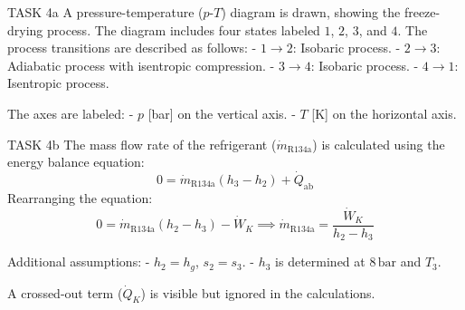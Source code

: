 TASK 4a  
A pressure-temperature (\( p \)-\( T \)) diagram is drawn, showing the freeze-drying process. The diagram includes four states labeled \( 1 \), \( 2 \), \( 3 \), and \( 4 \). The process transitions are described as follows:  
- \( 1 \to 2 \): Isobaric process.  
- \( 2 \to 3 \): Adiabatic process with isentropic compression.  
- \( 3 \to 4 \): Isobaric process.  
- \( 4 \to 1 \): Isentropic process.  

The axes are labeled:  
- \( p \) [bar] on the vertical axis.  
- \( T \) [K] on the horizontal axis.  

TASK 4b  
The mass flow rate of the refrigerant (\( \dot{m}_{\text{R134a}} \)) is calculated using the energy balance equation:  
\[
0 = \dot{m}_{\text{R134a}} (h_3 - h_2) + \dot{Q}_{\text{ab}}
\]  
Rearranging the equation:  
\[
0 = \dot{m}_{\text{R134a}} (h_2 - h_3) - \dot{W}_K \implies \dot{m}_{\text{R134a}} = \frac{\dot{W}_K}{h_2 - h_3}
\]  

Additional assumptions:  
- \( h_2 = h_g \), \( s_2 = s_3 \).  
- \( h_3 \) is determined at \( 8 \, \text{bar} \) and \( T_3 \).  

A crossed-out term (\( \dot{Q}_K \)) is visible but ignored in the calculations.